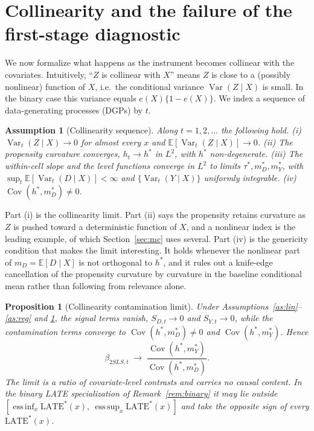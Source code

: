\documentclass[preprint,11pt,authoryear]{elsarticle}
\newtheorem{assumption}{Assumption}
\newtheorem{proposition}{Proposition}
\theoremstyle{definition}
\newcommand{\E}{\mathbb{E}}
\newcommand{\Cov}{\operatorname{Cov}}
\newcommand{\Var}{\operatorname{Var}}
\newcommand{\late}{\mathrm{LATE}}
\begin{document}
\section{Collinearity and the failure of the first-stage diagnostic}\label{sec:collin}

We now formalize what happens as the instrument becomes collinear with the
covariates. Intuitively, ``$Z$ is collinear with $X$'' means $Z$ is close to a
(possibly nonlinear) function of $X$, i.e.\ the conditional variance
$\Var(Z\mid X)$ is small. In the binary case this variance equals $e(X)\{1-e(X)\}$. We
index a sequence of data-generating processes (DGPs) by $t$.

\begin{assumption}[Collinearity sequence]\label{as:seq}
Along $t=1,2,\dots$ the following hold. (i) $\Var_t(Z\mid X)\to 0$ for almost every
$x$ and $\E[\Var_t(Z\mid X)]\to 0$. (ii) The propensity curvature converges,
$h_t\to h^\ast$ in $L^2$, with $h^\ast$ non-degenerate. (iii) The within-cell slope
and the level functions converge in $L^2$ to limits $\tau^\ast,m_D^\ast,m_Y^\ast$,
with $\sup_t\E[\Var_t(D\mid X)]<\infty$ and $\{\Var_t(Y\mid X)\}$ uniformly
integrable. (iv) $\Cov(h^\ast,m_D^\ast)\neq 0$.
\end{assumption}

Part (i) is the collinearity limit. Part (ii) says the propensity retains curvature as
$Z$ is pushed toward a deterministic function of $X$, and a nonlinear index is the
leading example, of which Section~\ref{sec:mc} uses several. Part (iv) is the genericity
condition that makes the limit interesting. It holds whenever the nonlinear part of
$m_D=\E[D\mid X]$ is not orthogonal to $h^\ast$, and it rules out a knife-edge
cancellation of the propensity curvature by curvature in the baseline conditional mean
rather than following from relevance alone.

\begin{proposition}[Collinearity contamination limit]\label{prop:collin}
Under Assumptions~\ref{as:lin}--\ref{as:reg} and \ref{as:seq}, the signal terms
vanish, $S_{D,t}\to 0$ and $S_{Y,t}\to 0$, while the contamination terms converge to
$\Cov(h^\ast,m_D^\ast)\neq0$ and $\Cov(h^\ast,m_Y^\ast)$. Hence
\begin{equation}\label{eq:limit}
\beta_{2SLS,t}\;\longrightarrow\;
\frac{\Cov(h^\ast,m_Y^\ast)}{\Cov(h^\ast,m_D^\ast)}.
\end{equation}
The limit is a ratio of covariate-level contrasts and carries no causal content. In
the binary LATE specialization of Remark~\ref{rem:binary} it may lie outside
$[\operatorname*{ess\,inf}_x \late^\ast(x),\ \operatorname*{ess\,sup}_x \late^\ast(x)]$
and take the opposite sign of every $\late^\ast(x)$.
\end{proposition}
\end{document}
